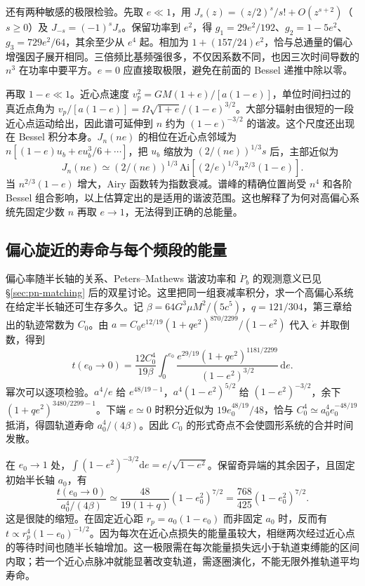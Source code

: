 还有两种敏感的极限检验。先取 $e\ll1$，用 $J_s(z)=(z/2)^s/s!+O(z^{s+2})$（$s\ge0$）及 $J_{-s}=(-1)^s J_s$。保留功率到 $e^2$，得 $g_1=29e^2/192$、$g_2=1-5e^2$、$g_3=729e^2/64$，其余至少从 $e^4$ 起。相加为 $1+(157/24)e^2$，恰与总通量的偏心增强因子展开相同。三倍频比基频强很多，不仅因系数不同，也因三次时间导数的 $n^3$ 在功率中要平方。$e=0$ 应直接取极限，避免在前面的 Bessel 递推中除以零。

再取 $1-e\ll1$。近心点速度 $v_p^2=GM(1+e)/[a(1-e)]$，单位时间扫过的真近点角为 $v_p/[a(1-e)]=\Omega\sqrt{1+e}/(1-e)^{3/2}$。大部分辐射由很短的一段近心点运动给出，因此谱可延伸到 $n$ 约为 $(1-e)^{-3/2}$ 的谐波。这个尺度还出现在 Bessel 积分本身。$J_n(ne)$ 的相位在近心点邻域为 $n[(1-e)u_b+eu_b^3/6+\cdots]$，把 $u_b$ 缩放为 $(2/(ne))^{1/3}s$ 后，主部近似为
\[
 J_n(ne)\simeq (2/(ne))^{1/3}\,
 \mathrm{Ai}\!\left[(2/e)^{1/3}n^{2/3}(1-e)\right].
\]
当 $n^{2/3}(1-e)$ 增大，Airy 函数转为指数衰减。谱峰的精确位置尚受 $n^4$ 和各阶 Bessel 组合影响，以上估算定出的是适用的谐波范围。这也解释了为何对高偏心系统先固定少数 $n$ 再取 $e\to1$，无法得到正确的总能量。

\subsection{偏心旋近的寿命与每个频段的能量}

偏心率随半长轴的关系、Peters--Mathews 谐波功率和 $\dot P_b$ 的观测意义已见 \S\ref{sec:pn-matching} 后的双星讨论。这里把同一组衰减率积分，求一个高偏心系统在给定半长轴还可生存多久。记 $\beta=64G^3\mu M^2/(5c^5)$，$q=121/304$，第三章给出的轨迹常数为 $C_0$。由 $a=C_0 e^{12/19}(1+qe^2)^{870/2299}/(1-e^2)$ 代入 $\dot e$ 并取倒数，得到
\[
 t(e_0\to 0)=\frac{12 C_0^4}{19\beta}
   \int_0^{e_0}
     \frac{e^{29/19}(1+qe^2)^{1181/2299}}{(1-e^2)^{3/2}}\,\mathrm de .
\]
幂次可以逐项检验。$a^4/e$ 给 $e^{48/19-1}$，$a^4(1-e^2)^{5/2}$ 给 $(1-e^2)^{-3/2}$，余下 $(1+qe^2)^{3480/2299-1}$。下端 $e\simeq0$ 时积分近似为 $19e_0^{48/19}/48$，恰与 $C_0^4\simeq a_0^4 e_0^{-48/19}$ 抵消，得圆轨道寿命 $a_0^4/(4\beta)$。因此 $C_0$ 的形式奇点不会使圆形系统的合并时间发散。

在 $e_0\to1$ 处，$\int(1-e^2)^{-3/2}\mathrm de=e/\sqrt{1-e^2}$。保留奇异端的其余因子，且固定初始半长轴 $a_0$，有
\[
 \frac{t(e_0\to0)}{a_0^4/(4\beta)}
 \simeq\frac{48}{19(1+q)}(1-e_0^2)^{7/2}
       =\frac{768}{425}(1-e_0^2)^{7/2}.
\]
这是很陡的缩短。在固定近心距 $r_p=a_0(1-e_0)$ 而非固定 $a_0$ 时，反而有 $t\propto r_p^4(1-e_0)^{-1/2}$。因为每次在近心点损失的能量虽较大，相继两次经过近心点的等待时间也随半长轴增加。这一极限需在每次能量损失远小于轨道束缚能的区间内取；若一个近心点脉冲就能显著改变轨道，需逐圈演化，不能无限外推轨道平均寿命。

